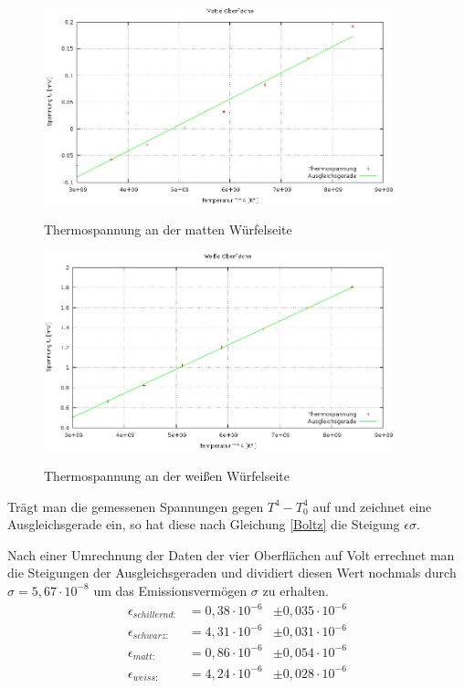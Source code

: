 \begin{figure}[H]
\includegraphics[width=0.9\textwidth]{pics/temp_matt.jpg}
\label{abstand}
\caption{Thermospannung an der matten Würfelseite}
\end{figure}

\begin{figure}[H]
\includegraphics[width=0.9\textwidth]{pics/temp_weis.jpg}
\label{abstand}
\caption{Thermospannung an der weißen Würfelseite}
\end{figure}

Trägt man die gemessenen Spannungen gegen $T^4-T_0^4$ auf und zeichnet eine Ausgleichsgerade ein, so hat diese nach Gleichung \eqref{Boltz} die Steigung $\epsilon\sigma$.

Nach einer Umrechnung der Daten der vier Oberflächen auf Volt errechnet man die Steigungen der Ausgleichsgeraden und dividiert diesen Wert nochmals durch $\sigma = 5,67\cdot 10^{-8}$ um das Emissionsvermögen $\sigma$ zu erhalten. 
\begin{align*}
\epsilon_{schillernd: }		&= 0,38\cdot10^{-6}     &\pm 0,035\cdot 10^{-6}  \\
\epsilon_{schwarz: }	 	&= 4,31\cdot10^{-6}     &\pm 0,031\cdot 10^{-6}  \\
\epsilon_{matt: }		 	&= 0,86\cdot10^{-6}     &\pm 0,054\cdot 10^{-6}  \\
\epsilon_{weiss: } 			&= 4,24\cdot10^{-6}     &\pm 0,028\cdot 10^{-6}  \\
\end{align*} 

